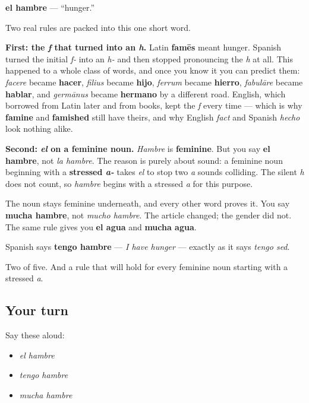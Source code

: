 \begin{cousinweb}
\textbf{el hambre} — \textquotedblleft{}hunger.\textquotedblright{}

Two real rules are packed into this one short word.

\textbf{First: the \emph{f} that turned into an \emph{h}.} Latin \textbf{famēs} meant hunger. Spanish turned the initial \emph{f-} into an \emph{h-} and then stopped pronouncing the \emph{h} at all. This happened to a whole class of words, and once you know it you can predict them: \emph{facere} became \textbf{hacer}, \emph{filius} became \textbf{hijo}, \emph{ferrum} became \textbf{hierro}, \emph{fabulāre} became \textbf{hablar}, and \emph{germānus} became \textbf{hermano} by a different road. English, which borrowed from Latin later and from books, kept the \emph{f} every time — which is why \textbf{famine} and \textbf{famished} still have theirs, and why English \emph{fact} and Spanish \emph{hecho} look nothing alike.

\textbf{Second: \emph{el} on a feminine noun.} \emph{Hambre} is \textbf{feminine}. But you say \textbf{el hambre}, not \emph{la hambre}. The reason is purely about sound: a feminine noun beginning with a \textbf{stressed \emph{a-}} takes \emph{el} to stop two \emph{a} sounds colliding. The silent \emph{h} does not count, so \emph{hambre} begins with a stressed \emph{a} for this purpose.

The noun stays feminine underneath, and every other word proves it. You say \textbf{mucha hambre}, not \emph{mucho hambre}. The article changed; the gender did not. The same rule gives you \textbf{el agua} and \textbf{mucha agua}.

Spanish says \textbf{tengo hambre} — \emph{I have hunger} — exactly as it says \emph{tengo sed}.
\end{cousinweb}

\begin{grammarlens}[title={What you've built}]
Two of five. And a rule that will hold for every feminine noun starting with a stressed \emph{a}.
\end{grammarlens}

\subsection*{Your turn}
Say these aloud:

\begin{itemize}
\raggedright
  \item \emph{el hambre}
  \item \emph{tengo hambre}
  \item \emph{mucha hambre}
\end{itemize}

